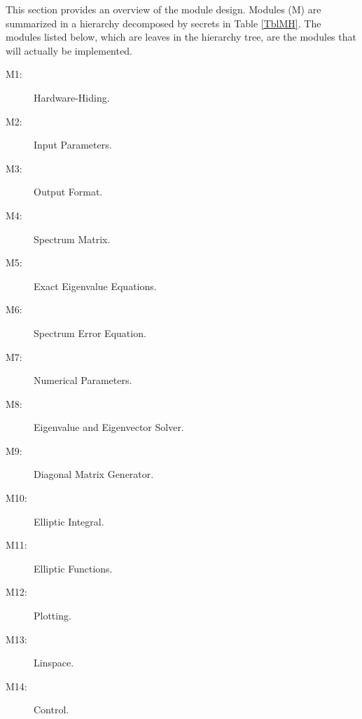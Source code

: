 \documentclass[12pt, titlepage]{article}
\begin{document}
This section provides an overview of the module design. Modules (M) are 
summarized
in a hierarchy decomposed by secrets in Table \ref{TblMH}. The modules listed
below, which are leaves in the hierarchy tree, are the modules that will
actually be implemented.
\begin{description}
\item[M1:] Hardware-Hiding.\\
\item[M2:] Input Parameters.\\
\item[M3:] Output Format.\\
\item[M4:] Spectrum Matrix.\\
\item[M5:] Exact Eigenvalue Equations.\\ 
\item[M6:] Spectrum Error Equation.\\
\item[M7:] Numerical Parameters. \\
\item[M8:] Eigenvalue and Eigenvector Solver. \\
\item[M9:] Diagonal Matrix Generator.\\ 
\item[M10:] Elliptic Integral. \\
\item[M11:] Elliptic Functions. \\
\item[M12:] Plotting. \\ 
\item[M13:] Linspace. \\ 
\item[M14:] Control. \\
\end{description}
\end{document}
